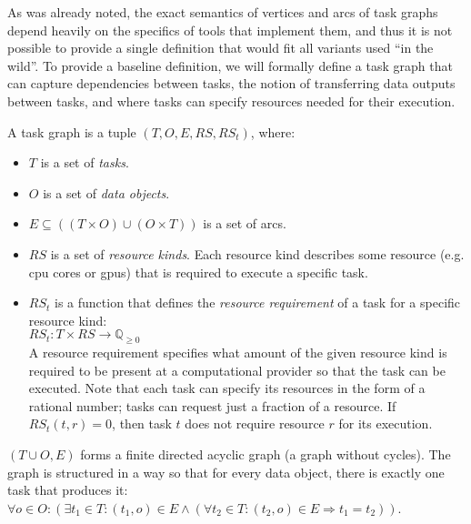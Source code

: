 As was already noted, the exact semantics of vertices and arcs of task graphs depend heavily on the
specifics of tools that implement them, and thus it is not possible to provide a single definition
that would fit all variants used ``in the wild''. To provide a baseline definition, we will
formally define a task graph that can capture dependencies between tasks, the notion of
transferring data outputs between tasks, and where tasks can specify resources needed for their
execution.

\newcommand{\alltaskpairs}{\forall t_1\in{}T, \forall t_2\in{}T}

A task graph is a tuple $(T, O, E, RS, RS_t)$, where:
\begin{itemize}[itemsep=0pt]
	\item $T$ is a set of \emph{tasks}.
	\item $O$ is a set of \emph{data objects}.
	\item $E \subseteq ((T\times{}O) \cup (O\times{}T))$ is a set of arcs.
	\item $RS$ is a set of \emph{resource kinds}. Each resource kind describes some resource
	      (e.g. \gls{cpu} cores or \glspl{gpu})
	      that is required to execute a specific task.
	\item $RS_t$ is a function that defines the \emph{resource requirement} of a task for
	      a specific resource kind: \\ $RS_t\colon T \times RS \rightarrow \mathbb{Q}_{\geq{}0}$ \\ A resource requirement specifies what amount
	      of the given resource kind is required to be present at a computational provider so that the task
	      can be executed. Note that each task can specify its resources in the form of a rational number;
	      tasks can request just a fraction of a resource. If $RS_t(t, r) = 0$, then task
	      $t$ does not require resource $r$ for its execution.
\end{itemize}

$(T \cup O, E)$ forms a finite directed acyclic graph (a graph without cycles). The graph is
structured in a way so that for every data
object, there is exactly one task that produces it: \\ $\forall o\in{}O: (\exists t_1\in{}T: (t_1, o) \in E \land
	(\forall t_2\in{}T: (t_2, o) \in E \Rightarrow t_1 = t_2))$.

